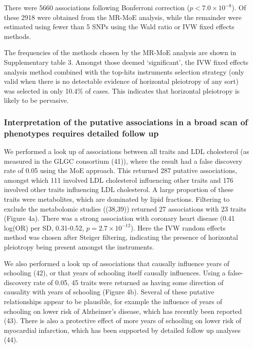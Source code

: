 \documentclass[]{article}
\begin{document}
There were 5660 associations following Bonferroni correction
(\(p < 7.0 \times 10^{-8}\)). Of these 2918 were obtained from the
MR-MoE analysis, while the remainder were estimated using fewer than 5
SNPs using the Wald ratio or IVW fixed effects methods.

The frequencies of the methods chosen by the MR-MoE analysis are shown
in Supplementary table 3. Amongst those deemed `significant', the IVW
fixed effects analysis method combined with the top-hits instruments
selection strategy (only valid when there is no detectable evidence of
horizontal pleiotropy of any sort) was selected in only 10.4\% of cases.
This indicates that horizontal pleiotropy is likely to be pervasive.

\subsubsection{Interpretation of the putative associations in a broad
scan of phenotypes requires detailed follow
up}\label{interpretation-of-the-putative-associations-in-a-broad-scan-of-phenotypes-requires-detailed-follow-up}

We performed a look up of associations between all traits and LDL
cholesterol (as measured in the GLGC consortium (41)), where the result
had a false discovery rate of 0.05 using the MoE approach. This returned
287 putative associations, amongst which 111 involved LDL cholesterol
influencing other traits and 176 involved other traits influencing LDL
cholesterol. A large proportion of these traits were metabolites, which
are dominated by lipid fractions. Filtering to exclude the metabolomic
studies ((38,39)) returned 27 associations with 23 traits (Figure 4a).
There was a strong association with coronary heart disease (0.41 log(OR)
per SD, 0.31-0.52, \(p=2.7\times10^{-12}\)). Here the IVW random effects
method was chosen after Steiger filtering, indicating the presence of
horizontal pleiotropy being present amongst the instruments.

We also performed a look up of associations that causally influence
years of schooling (42), or that years of schooling itself causally
influences. Using a false-discovery rate of 0.05, 45 traits were
returned as having some direction of causality with years of schooling
(Figure 4b). Several of these putative relationships appear to be
plausible, for example the influence of years of schooling on lower risk
of Alzheimer's disease, which has recently been reported (43). There is
also a protective effect of more years of schooling on lower risk of
myocardial infarction, which has been supported by detailed follow up
analyses (44).
\end{document}
